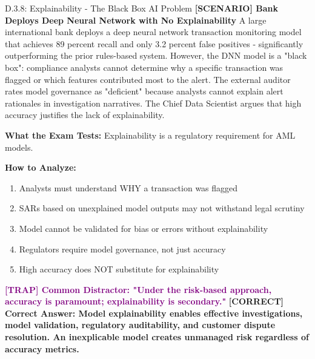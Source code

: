 \documentclass[11pt,a4paper]{beamer}
\newcommand{\trap}[1]{\textcolor{purple}{\textbf{[TRAP] #1}}}
\newcommand{\correct}[1]{\textcolor{green!50!black}{\textbf{[CORRECT] #1}}}
\newcommand{\scenario}[1]{\textcolor{blue!70!black}{\textbf{[SCENARIO] #1}}}
\begin{document}
\begin{frame}{D.3.8: Explainability - The Black Box AI Problem}
	\scenario{Bank Deploys Deep Neural Network with No Explainability}
	A large international bank deploys a deep neural network transaction monitoring model that achieves 89 percent recall and only 3.2 percent false positives - significantly outperforming the prior rules-based system. However, the DNN model is a "black box": compliance analysts cannot determine why a specific transaction was flagged or which features contributed most to the alert. The external auditor rates model governance as "deficient" because analysts cannot explain alert rationales in investigation narratives. The Chief Data Scientist argues that high accuracy justifies the lack of explainability.
	
	\vspace{0.1cm}
	\textbf{What the Exam Tests:} Explainability is a regulatory requirement for AML models.
	
	\vspace{0.1cm}
	\textbf{How to Analyze:}
	\begin{enumerate}
		\item Analysts must understand WHY a transaction was flagged
		\item SARs based on unexplained model outputs may not withstand legal scrutiny
		\item Model cannot be validated for bias or errors without explainability
		\item Regulators require model governance, not just accuracy
		\item High accuracy does NOT substitute for explainability
	\end{enumerate}
	
	\trap{Common Distractor: "Under the risk-based approach, accuracy is paramount; explainability is secondary."}
	\correct{Correct Answer: Model explainability enables effective investigations, model validation, regulatory auditability, and customer dispute resolution. An inexplicable model creates unmanaged risk regardless of accuracy metrics.}
\end{frame}
\end{document}
